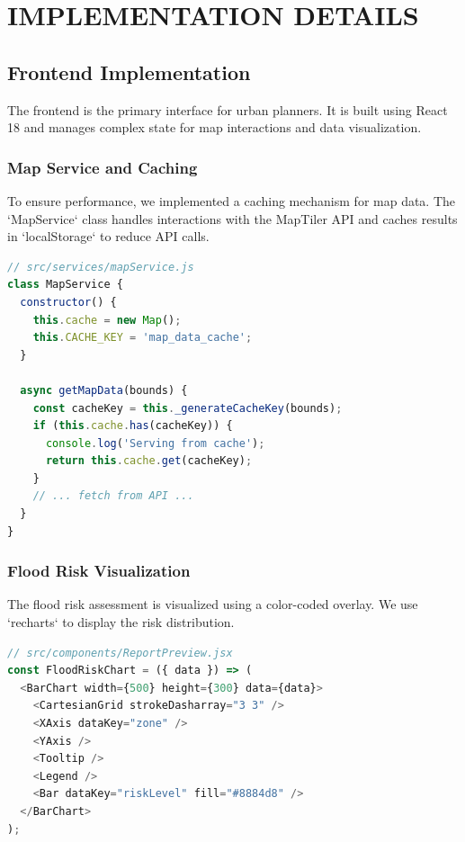\documentclass[12pt,a4paper]{report}
\begin{document}
\chapter{IMPLEMENTATION DETAILS}

\section{Frontend Implementation}
The frontend is the primary interface for urban planners. It is built using React 18 and manages complex state for map interactions and data visualization.

\subsection{Map Service and Caching}
To ensure performance, we implemented a caching mechanism for map data. The `MapService` class handles interactions with the MapTiler API and caches results in `localStorage` to reduce API calls.

\begin{lstlisting}[language=JavaScript, caption=Map Service Caching Logic]
// src/services/mapService.js
class MapService {
  constructor() {
    this.cache = new Map();
    this.CACHE_KEY = 'map_data_cache';
  }

  async getMapData(bounds) {
    const cacheKey = this._generateCacheKey(bounds);
    if (this.cache.has(cacheKey)) {
      console.log('Serving from cache');
      return this.cache.get(cacheKey);
    }
    // ... fetch from API ...
  }
}
\end{lstlisting}

\subsection{Flood Risk Visualization}
The flood risk assessment is visualized using a color-coded overlay. We use `recharts` to display the risk distribution.

\begin{lstlisting}[language=JavaScript, caption=Flood Risk Component]
// src/components/ReportPreview.jsx
const FloodRiskChart = ({ data }) => (
  <BarChart width={500} height={300} data={data}>
    <CartesianGrid strokeDasharray="3 3" />
    <XAxis dataKey="zone" />
    <YAxis />
    <Tooltip />
    <Legend />
    <Bar dataKey="riskLevel" fill="#8884d8" />
  </BarChart>
);
\end{lstlisting}
\end{document}

